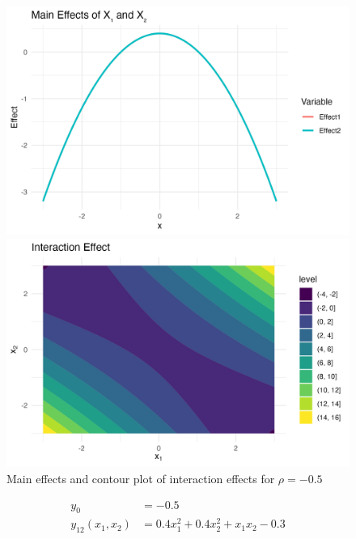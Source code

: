 \begin{figure}[htpb]
    \centering
    \begin{minipage}[t]{0.49\textwidth}
        \centering
        \includegraphics[width=\textwidth]{images/interaction_a1p00_a2p00_a11p00_a22p00_a12p10_rhom05_main.png}
    \end{minipage}%
    \hfill
    \begin{minipage}[t]{0.49\textwidth}
        \centering
        \includegraphics[width=\textwidth]{images/interaction_a1p00_a2p00_a11p00_a22p00_a12p10_rhom05_interaction.png}
    \end{minipage}
    \caption{Main effects and contour plot of interaction effects for $\rho = -0.5$}
    \label{fig:interaction_rho_neg05}
\end{figure}
\begin{align*}
y_0 &= -0.5 \\[3pt]
y_{12}(x_1,x_2) &= 0.4x_1^2 + 0.4x_2^2 + x_1x_2 - 0.3
\end{align*}


